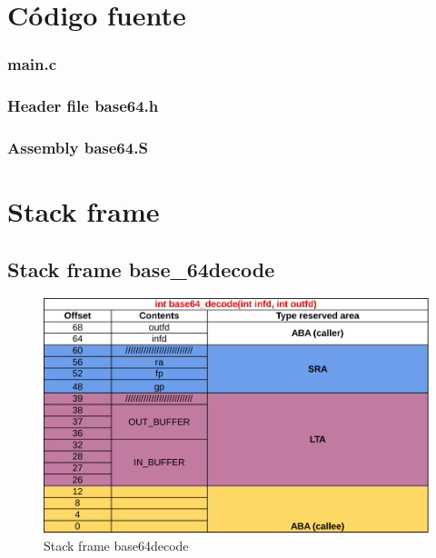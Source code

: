 \documentclass[11pt,a4paper]{article}
\begin{document}
\section{Código fuente}\label{appendix_codigo_fuente}

\subsubsection{main.c}\label{main}


\newpage

\subsubsection{Header file base64.h}\label{base64.h}


\newpage

\subsubsection{Assembly base64.S}\label{base64.S}




\newpage

\section{Stack frame}

\subsection{Stack frame base\_64decode}
\begin{figure}[H]
  \centering
    \includegraphics[width=14cm]{base64decodeStackFrame}
    \caption{Stack frame base64decode}
  \label{fig:base64decodeStackFrame}
\end{figure}
\end{document}

